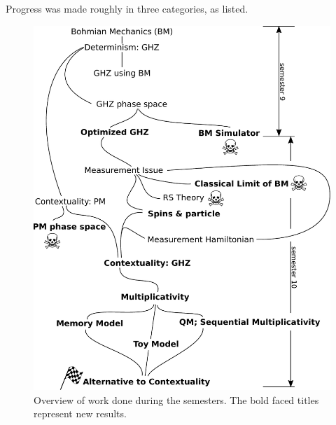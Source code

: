 Progress was made roughly in three categories, as listed. 
\begin{figure}
\begin{centering}
\includegraphics[width=0.75\columnwidth]{Chapter5/Figs/Vector/flow}
\par\end{centering}

\caption{Overview of work done during the semesters. The bold faced titles
represent new results.}
\end{figure}

